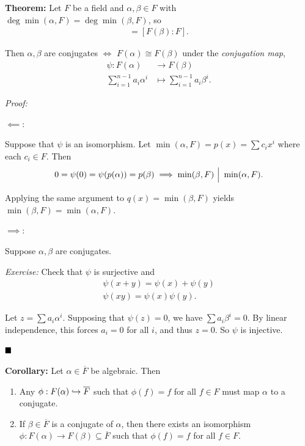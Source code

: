 \textbf{Theorem:} Let \(F\) be a field and \(\alpha, \beta \in F\) with
\(\deg \min (\alpha, F) = \deg \min (\beta, F)\), so \begin{align*}
[F(\alpha): F] = [F(\beta): F]
.\end{align*}

Then \(\alpha, \beta\) are conjugates \(\iff\)
\(F(\alpha) \cong F(\beta)\) under the \emph{conjugation map},
\begin{align*}
\psi: F(\alpha) &\to F(\beta) \\
\sum_{i=1}^{n-1} a_i \alpha^i &\mapsto \sum_{i=1}^{n-1} a_i \beta^i
.\end{align*}

\emph{Proof:}

\(\impliedby\):

Suppose that \(\psi\) is an isomorphism. Let
\(\min(\alpha, F) = p(x) = \sum c_i x^i\) where each \(c_i \in F\). Then
\begin{align*}
0 = \psi(0) = \psi(p(\alpha)) = p(\beta) \implies \min(\beta, F) {~\Bigm| ~} \min(\alpha, F)
.\end{align*}

Applying the same argument to \(q(x) = \min(\beta, F)\) yields
\(\min(\beta, F) = \min(\alpha, F)\).

\(\implies\):

Suppose \(\alpha, \beta\) are conjugates.

\emph{Exercise:} Check that \(\psi\) is surjective and \begin{align*}
\psi(x+y) = \psi(x) + \psi(y) \\
\psi(xy) = \psi(x) \psi(y)
.\end{align*}

Let \(z = \sum a_i \alpha^i\). Supposing that \(\psi(z) = 0\), we have
\(\sum a_i \beta^i = 0\). By linear independence, this forces
\(a_i = 0\) for all \(i\), and thus \(z=0\). So \(\psi\) is injective.

\(\qed\)

\textbf{Corollary:} Let \(\alpha \in \overline F\) be algebraic. Then

\begin{enumerate}
\def\labelenumi{\arabic{enumi}.}
\item
  Any \(\phi: F(\alpha) \hookrightarrow \overline F\) such that \(\phi(f) = f\)
  for all \(f\in F\) must map \(\alpha\) to a conjugate.
\item
  If \(\beta \in \overline F\) is a conjugate of \(\alpha\), then there
  exists an isomorphism
  \(\phi: F(\alpha) \to F(\beta) \subseteq \overline F\) such that
  \(\phi(f) = f\) for all \(f\in F\).
\end{enumerate}

